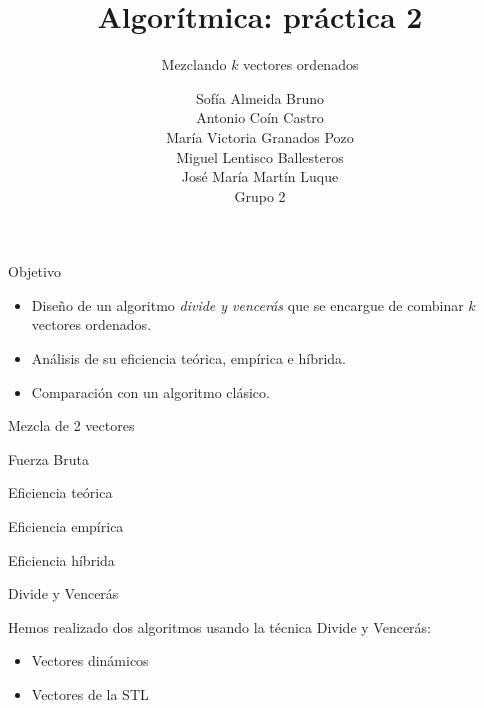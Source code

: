 \documentclass[spanish]{beamer}
\title{Algorítmica: práctica 2}
\subtitle{Mezclando $k$ vectores ordenados}
\author{Sofía Almeida Bruno\\ Antonio Coín Castro\\ María Victoria Granados Pozo\\ Miguel Lentisco Ballesteros\\ José María Martín Luque\\ \vspace{1em}Grupo 2}
\begin{document}
\maketitle

\begin{frame}{Objetivo}

	\begin{itemize}
		\item Diseño de un algoritmo \textit{divide y vencerás} que se encargue de combinar $k$ vectores ordenados. 
		\item Análisis de su eficiencia teórica, empírica e híbrida.
		\item Comparación con un algoritmo clásico.
	\end{itemize}

\end{frame}



\begin{frame}{Mezcla de 2 vectores}

	
\end{frame}


\begin{frame}{Fuerza Bruta}
	
\end{frame}



\begin{frame}{Eficiencia teórica}


\end{frame}

\begin{frame}{Eficiencia empírica}
	\begin{center}
		\resizebox*{11cm}{!}{
			}
	\end{center}

\end{frame}

\begin{frame}{Eficiencia híbrida}
	\begin{center}
	\resizebox*{11cm}{!}{
		
	}
	\end{center}
\end{frame}


\begin{frame}{Divide y Vencerás}

	Hemos realizado dos algoritmos usando la técnica Divide y Vencerás:
	\begin{itemize}
		\item Vectores dinámicos
		\item Vectores de la STL
	\end{itemize}
\end{frame}
\end{document}
